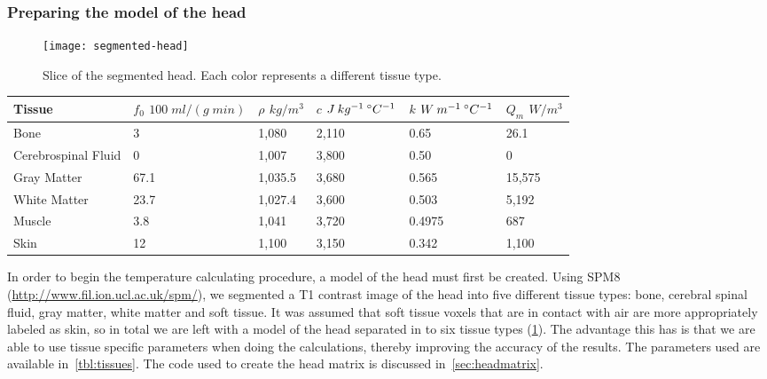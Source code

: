     \subsubsection{Preparing the model of the head}
    \begin{figure}[tb] 
      \centering\hspace*{20px} 
    	\texttt{[image: segmented-head]} 
    	\caption{\label{fig:segmented} Slice of the segmented head. Each color represents a different tissue type.} 
    \end{figure}
    \begin{table*}[tb] 
      \caption[Tissue-specific parameters]{\label{tbl:tissues} Tissue-specific parameters used to calculate the temperature change (from~\citet{collins}).} 
      \vspace{10pt}
      \small
    		\begin{tabular*}{\linewidth}{@{} l p{2.7cm}p{2cm}p{2.4cm}p{2.5cm}p{2cm}@{}}
    		  \toprule
    		  Tissue & $f_0$ \newline $100 \; ml/(g \; min)$ & $\rho$ \newline $kg/m^{3}$ & $c$ \newline $J \: kg^{-1} \: ^\circ C^{-1}$ & $k$ \newline $W \: m^{-1} \: ^\circ C^{-1}$ & $Q_{m}$ \newline $W/m^{3}$ \\
    		  \midrule
    			Bone & 3 & 1,080 & 2,110 & 0.65 & 26.1 \\
    			Cerebrospinal Fluid & 0 & 1,007 & 3,800 & 0.50 & 0 \\
    			Gray Matter & 67.1 & 1,035.5 & 3,680 & 0.565 & 15,575 \\
    			White Matter & 23.7 & 1,027.4 & 3,600 & 0.503 & 5,192 \\
    			Muscle & 3.8 & 1,041 & 3,720 & 0.4975 & 687 \\
    			Skin & 12 & 1,100 & 3,150 & 0.342 & 1,100 \\
    			\bottomrule
    		\end{tabular*}
    \end{table*}
  In order to begin the temperature calculating procedure, a model of the head must first be created.  Using SPM8 (\url{http://www.fil.ion.ucl.ac.uk/spm/}), we segmented a T1 contrast image of the head into five different tissue types: bone, cerebral spinal fluid, gray matter, white matter and soft tissue.  It was assumed that soft tissue voxels that are in contact with air are more appropriately labeled as skin, so in total we are left with a model of the head separated in to six tissue types (\cref{fig:segmented}).  The advantage this has is that we are able to use tissue specific parameters when doing the calculations, thereby improving the accuracy of the results.  The parameters used are available in~\cref{tbl:tissues}.  The code used to create the head matrix is discussed in~\cref{sec:headmatrix}.

